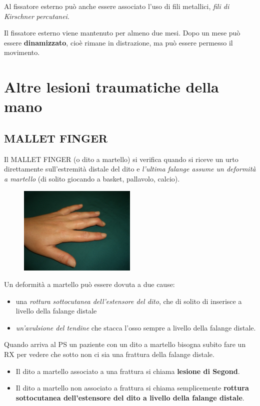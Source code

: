 Al fissatore esterno può anche essere associato l'uso di fili metallici, \emph{fili di Kirschner} \emph{percutanei}.

Il fissatore esterno viene mantenuto per almeno due mesi. Dopo un mese può essere \textbf{dinamizzato}, cioè rimane in distrazione, ma può essere permesso il movimento.

\section{Altre lesioni traumatiche della mano}

\subsection{MALLET FINGER}

Il MALLET FINGER (o dito a martello) si verifica quando si riceve un urto direttamente sull'estremità distale del dito e \emph{l'ultima falange assume un deformità a martello} (di solito giocando a basket,
pallavolo, calcio).

\begin{figure}[!ht]
\centering
\includegraphics[width=0.5\textwidth]{004/image11.jpeg}
\end{figure}

Un deformità a martello può essere dovuta a due cause:

\begin{itemize}
\item
  una \emph{rottura sottocutanea dell'estensore del dito}, che di solito di inserisce a livello della falange distale
\item
  \emph{un'avulsione del tendine} che stacca l'osso sempre a livello della falange distale.
\end{itemize}

Quando arriva al PS un paziente con un dito a martello bisogna subito
fare un RX per vedere che sotto non ci sia una frattura della falange
distale.

\begin{itemize}
\item
  Il dito a martello associato a una frattura si chiama \textbf{lesione di Segond}.
\item
  Il dito a martello non associato a frattura si chiama semplicemente \textbf{rottura sottocutanea dell'estensore del dito a livello della falange distale}.
\end{itemize}

